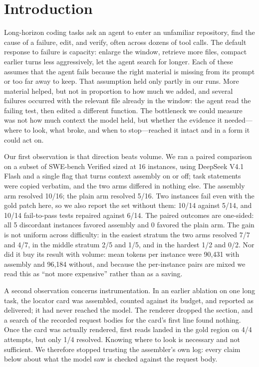 \section{Introduction}

Long-horizon coding tasks ask an agent to enter an unfamiliar repository, find the cause of a failure, edit, and verify, often across dozens of tool calls.
The default response to failure is capacity: enlarge the window, retrieve more files, compact earlier turns less aggressively, let the agent search for longer.
Each of these assumes that the agent fails because the right material is missing from its prompt or too far away to keep.
That assumption held only partly in our runs.
More material helped, but not in proportion to how much we added, and several failures occurred with the relevant file already in the window: the agent read the failing test, then edited a different function.
The bottleneck we could measure was not how much context the model held, but whether the evidence it needed---where to look, what broke, and when to stop---reached it intact and in a form it could act on.

Our first observation is that direction beats volume.
We ran a paired comparison on a subset of SWE-bench Verified sized at 16 instances, using DeepSeek V4.1 Flash and a single flag that turns context assembly on or off; task statements were copied verbatim, and the two arms differed in nothing else.
The assembly arm resolved 10/16; the plain arm resolved 5/16.
Two instances fail even with the gold patch here, so we also report the set without them: 10/14 against 5/14, and 10/14 fail-to-pass tests repaired against 6/14.
The paired outcomes are one-sided: all 5 discordant instances favored assembly and 0 favored the plain arm.
The gain is not uniform across difficulty: in the easiest stratum the two arms resolved 7/7 and 4/7, in the middle stratum 2/5 and 1/5, and in the hardest 1/2 and 0/2.
Nor did it buy its result with volume: mean tokens per instance were 90,431 with assembly and 96,184 without, and because the per-instance pairs are mixed we read this as ``not more expensive'' rather than as a saving.

A second observation concerns instrumentation.
In an earlier ablation on one long task, the locator card was assembled, counted against its budget, and reported as delivered; it had never reached the model.
The renderer dropped the section, and a search of the recorded request bodies for the card's first line found nothing.
Once the card was actually rendered, first reads landed in the gold region on 4/4 attempts, but only 1/4 resolved.
Knowing where to look is necessary and not sufficient.
We therefore stopped trusting the assembler's own log: every claim below about what the model saw is checked against the request body.

